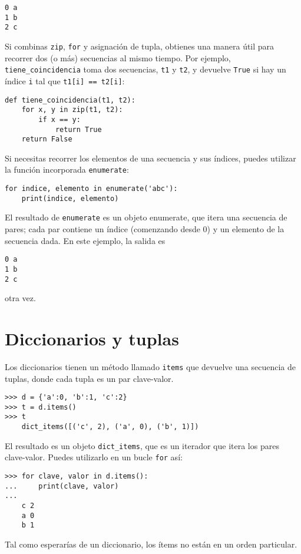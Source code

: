 \documentclass[10pt]{book}
\begin{document}
\begin{verbatim}
0 a
1 b
2 c
\end{verbatim}
%
Si combinas {\tt zip}, {\tt for} y asignación de tupla, obtienes una
manera útil para recorrer dos (o más) secuencias al mismo
tiempo.  Por ejemplo, \verb"tiene_coincidencia" toma dos secuencias, {\tt t1} y
{\tt t2}, y devuelve {\tt True} si hay un índice {\tt i}
tal que {\tt t1[i] == t2[i]}:

\begin{verbatim}
def tiene_coincidencia(t1, t2):
    for x, y in zip(t1, t2):
        if x == y:
            return True
    return False
\end{verbatim}
%
Si necesitas recorrer los elementos de una secuencia y sus
índices, puedes utilizar la función incorporada {\tt enumerate}:

\begin{verbatim}
for indice, elemento in enumerate('abc'):
    print(indice, elemento)
\end{verbatim}
%
El resultado de {\tt enumerate} es un objeto enumerate, que
itera una secuencia de pares; cada par contiene un índice (comenzando
desde 0) y un elemento de la secuencia dada.
En este ejemplo, la salida es

\begin{verbatim}
0 a
1 b
2 c
\end{verbatim}
%
otra vez.


\section{Diccionarios y tuplas}
\label{dictuple}

Los diccionarios tienen un método llamado {\tt items} que devuelve una secuencia de
tuplas, donde cada tupla es un par clave-valor.

\begin{verbatim}
>>> d = {'a':0, 'b':1, 'c':2}
>>> t = d.items()
>>> t
    dict_items([('c', 2), ('a', 0), ('b', 1)])
\end{verbatim}
%
El resultado es un objeto \verb"dict_items", que es un iterador que
itera los pares clave-valor.  Puedes utilizarlo en un bucle {\tt for}
así:

\begin{verbatim}
>>> for clave, valor in d.items():
...     print(clave, valor)
...
    c 2
    a 0
    b 1
\end{verbatim}
%
Tal como esperarías de un diccionario, los ítems no están en un
orden particular.
\end{document}
